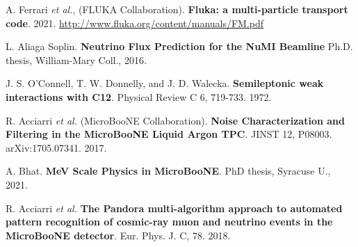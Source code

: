  A. Ferrari \textit{et al.}, (FLUKA Collaboration). \textbf{Fluka:
a multi-particle transport code}. 2021. \href{http://www.fluka.org/content/manuals/FM.pdf
}{http://www.fluka.org/content/manuals/FM.pdf}

 L. Aliaga Soplin. \textbf{Neutrino Flux Prediction for the NuMI Beamline} Ph.D. thesis, William-Mary Coll., 2016.

 J. S. O’Connell, T. W. Donnelly, and J. D. Walecka. \textbf{Semileptonic weak interactions with C12}. Physical Review C 6, 719-733. 1972.

 R. Acciarri \textit{et al.} (MicroBooNE Collaboration). \textbf{Noise Characterization and Filtering in the MicroBooNE Liquid Argon TPC}. JINST 12, P08003. arXiv:1705.07341. 2017. 

 A. Bhat. \textbf{MeV Scale Physics in MicroBooNE}. PhD thesis, Syracuse U., 2021.

 R. Acciarri \textit{et al.} \textbf{The Pandora multi-algorithm approach to automated pattern recognition of cosmic-ray muon and neutrino events in the MicroBooNE detector}. Eur. Phys. J. C, 78. 2018.